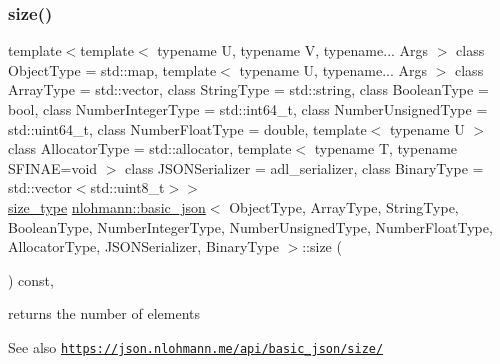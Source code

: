 \subsubsection{\texorpdfstring{size()}{size()}}
{\footnotesize\ttfamily template$<$template$<$ typename U, typename V, typename... Args $>$ class Object\+Type = std\+::map, template$<$ typename U, typename... Args $>$ class Array\+Type = std\+::vector, class String\+Type  = std\+::string, class Boolean\+Type  = bool, class Number\+Integer\+Type  = std\+::int64\+\_\+t, class Number\+Unsigned\+Type  = std\+::uint64\+\_\+t, class Number\+Float\+Type  = double, template$<$ typename U $>$ class Allocator\+Type = std\+::allocator, template$<$ typename T, typename S\+F\+I\+N\+A\+E=void $>$ class J\+S\+O\+N\+Serializer = adl\+\_\+serializer, class Binary\+Type  = std\+::vector$<$std\+::uint8\+\_\+t$>$$>$ \\
\hyperlink{classnlohmann_1_1basic__json_a3ada29bca70b4965f6fd37ec1c8f85f7}{size\+\_\+type} \hyperlink{classnlohmann_1_1basic__json}{nlohmann\+::basic\+\_\+json}$<$ Object\+Type, Array\+Type, String\+Type, Boolean\+Type, Number\+Integer\+Type, Number\+Unsigned\+Type, Number\+Float\+Type, Allocator\+Type, J\+S\+O\+N\+Serializer, Binary\+Type $>$\+::size (\begin{DoxyParamCaption}{ }\end{DoxyParamCaption}) const\hspace{0.3cm}{\ttfamily [inline]}, {\ttfamily [noexcept]}}



returns the number of elements 

\begin{DoxySeeAlso}{See also}
\href{https://json.nlohmann.me/api/basic_json/size/}{\tt https\+://json.\+nlohmann.\+me/api/basic\+\_\+json/size/} 
\end{DoxySeeAlso}
\mbox{\label{classnlohmann_1_1basic__json_a94295a06e0e7b3867fe83afbee4cb202}} 
